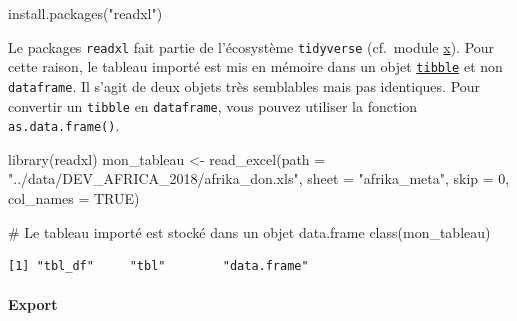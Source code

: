 \documentclass[
  letterpaper,
  DIV=11,
  numbers=noendperiod]{scrartcl}
\let\oldparagraph\paragraph
\renewcommand{\paragraph}[1]{\oldparagraph{#1}\mbox{}}
\newenvironment{Shaded}{\begin{snugshade}}{\end{snugshade}}
\newcommand{\AttributeTok}[1]{\textcolor[rgb]{0.40,0.45,0.13}{#1}}
\newcommand{\CommentTok}[1]{\textcolor[rgb]{0.37,0.37,0.37}{#1}}
\newcommand{\ConstantTok}[1]{\textcolor[rgb]{0.56,0.35,0.01}{#1}}
\newcommand{\DecValTok}[1]{\textcolor[rgb]{0.68,0.00,0.00}{#1}}
\newcommand{\FunctionTok}[1]{\textcolor[rgb]{0.28,0.35,0.67}{#1}}
\newcommand{\NormalTok}[1]{\textcolor[rgb]{0.00,0.23,0.31}{#1}}
\newcommand{\OtherTok}[1]{\textcolor[rgb]{0.00,0.23,0.31}{#1}}
\newcommand{\StringTok}[1]{\textcolor[rgb]{0.13,0.47,0.30}{#1}}
\begin{document}
\begin{Shaded}
\begin{Highlighting}[]
\FunctionTok{install.packages}\NormalTok{(}\StringTok{"readxl"}\NormalTok{)}
\end{Highlighting}
\end{Shaded}

\begin{tcolorbox}[enhanced jigsaw, colframe=quarto-callout-important-color-frame, bottomtitle=1mm, colback=white, leftrule=.75mm, breakable, left=2mm, titlerule=0mm, toptitle=1mm, arc=.35mm, title=\textcolor{quarto-callout-important-color}{\faExclamation}\hspace{0.5em}{Important}, rightrule=.15mm, bottomrule=.15mm, toprule=.15mm, colbacktitle=quarto-callout-important-color!10!white, opacitybacktitle=0.6, opacityback=0, coltitle=black]

Le packages \texttt{readxl} fait partie de l'écosystème
\texttt{tidyverse} (cf.~module \href{}{x}). Pour cette raison, le
tableau importé est mis en mémoire dans un objet
\href{https://tibble.tidyverse.org/}{\texttt{tibble}} et non
\texttt{dataframe}. Il s'agit de deux objets très semblables mais pas
identiques. Pour convertir un \texttt{tibble} en \texttt{dataframe},
vous pouvez utiliser la fonction \texttt{as.data.frame()}.

\end{tcolorbox}

\begin{Shaded}
\begin{Highlighting}[]
\FunctionTok{library}\NormalTok{(readxl)}
\NormalTok{mon\_tableau }\OtherTok{\textless{}{-}} \FunctionTok{read\_excel}\NormalTok{(}\AttributeTok{path =} \StringTok{"../data/DEV\_AFRICA\_2018/afrika\_don.xls"}\NormalTok{, }
                          \AttributeTok{sheet =} \StringTok{"afrika\_meta"}\NormalTok{, }
                          \AttributeTok{skip =} \DecValTok{0}\NormalTok{,}
                          \AttributeTok{col\_names =} \ConstantTok{TRUE}\NormalTok{)}

\CommentTok{\# Le tableau importé est stocké dans un objet data.frame}
\FunctionTok{class}\NormalTok{(mon\_tableau)}
\end{Highlighting}
\end{Shaded}

\begin{verbatim}
[1] "tbl_df"     "tbl"        "data.frame"
\end{verbatim}

\hypertarget{export-1}{%
\paragraph{Export}\label{export-1}}
\end{document}
